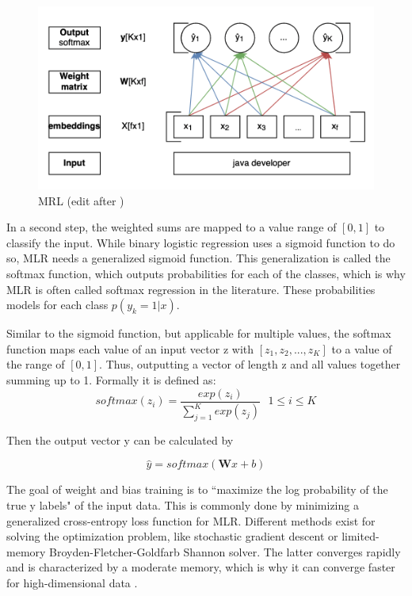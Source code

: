 \documentclass[12pt, a4paper, titlepage]{article}
\begin{document}
\begin{figure}[hb!]
  \center
  \includegraphics[scale=0.5]{LR.png}
  \caption[MLR]{\label{fig: F7} MRL (edit after \citep[p.]{jurafsky2021})}
\end{figure}

In a second step, the weighted sums are mapped to a value range of $[0,1]$ to classify the input. While binary logistic regression uses a sigmoid function to do so, \ac{MLR} needs a generalized sigmoid function. This generalization is called the softmax function, which outputs probabilities for each of the classes, which is why \ac{MLR} is often called softmax regression in the literature. These probabilities models for each class $p(y_k = 1|x)$.

Similar to the sigmoid function, but applicable for multiple values, the softmax function maps each value of an input vector z with $[z_1, z_2, ..., z_K]$ to a value of the range of $[0,1]$. Thus, outputting a vector of length z and all values together summing up to 1. Formally it is defined as: 
\[ softmax(z_i) = \frac{exp(z_i)}{\sum^K_{j=1} exp(z_j)} \text{ } 1 \leq i \leq K \]

Then the output vector y can be calculated by 

\[ \hat{y} = softmax(\textbf{W}x+b) \]

The goal of weight and bias training is to ``maximize the log probability of the true y labels" of the input data. This is commonly done by minimizing a generalized cross-entropy loss function for \ac{MLR}. Different methods exist for solving the optimization problem, like stochastic gradient descent or limited-memory Broyden-Fletcher-Goldfarb Shannon solver. The latter converges rapidly and is characterized by a moderate memory, which is why it can converge faster for high-dimensional data \citep{fei2014, scikit-learn}. 
\end{document}
